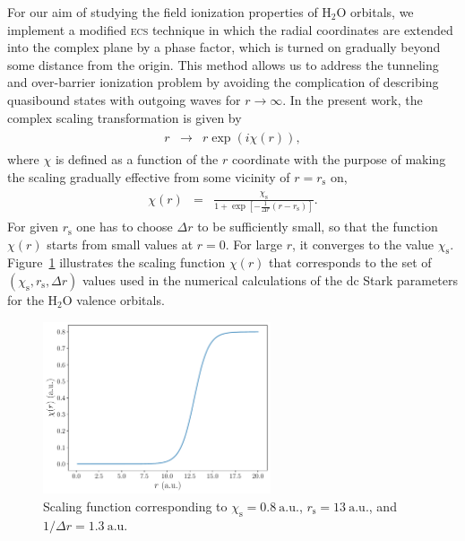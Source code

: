 For our aim of studying the field ionization properties of H$_{2}$O
orbitals, we implement a modified \textsc{ecs} technique in which the
radial coordinates are extended into the complex plane by a phase
factor, which is turned on gradually beyond some distance from the
origin. This method allows us to address the tunneling and
over-barrier ionization problem by avoiding the complication of
describing quasibound states with outgoing waves for $r \to
\infty$. In the present work, the complex scaling transformation is
given by
%
\begin{eqnarray}
  \begin{split}
    r & \rightarrow & r\exp(i\chi(r)),
  \end{split}
\label{eq:ecs_r}
\end{eqnarray}
%
where $\chi$ is defined as a function of the $r$ coordinate with the
purpose of making the scaling gradually effective from some vicinity
of $r = r_{\mathrm{s}}$ on,
%
\begin{eqnarray}
  \begin{split}
    \chi(r) & = & \frac{\chi_{\mathrm{s}}}{1+\exp[-\frac{1}{\Delta r}
        (r - r_{\mathrm{s}})]}.
  \end{split}
\label{eq:ecs_theta}
\end{eqnarray} 
%
For given $r_{\mathrm{s}}$ one has to choose $\Delta r$ to be
sufficiently small, so that the function $\chi(r)$ starts from small
values at $r = 0$. For large $r$, it converges to the value
$\chi_{\mathrm{s}}$. Figure~\ref{fig:scaling} illustrates the scaling
function $\chi(r)$ that corresponds to the set of $(\chi_{\mathrm{s}},
r_{\mathrm{s}}, \Delta r)$ values used in the numerical calculations
of the dc Stark parameters for the H$_{2}$O valence orbitals.

\begin{figure}
  \centering
  \includegraphics[width=0.6\textwidth]{figures/ch_H2O/1b1_1b2/scaling.pdf}
  \caption{Scaling function corresponding to $\chi_{\mathrm{s}} =
    0.8\ \mathrm{a.u.}$, $r_{\mathrm{s}} = 13\ \mathrm{a.u.}$, and $1
    / \Delta r = 1.3\ \mathrm{a.u.}$}
  \label{fig:scaling}
\end{figure}


